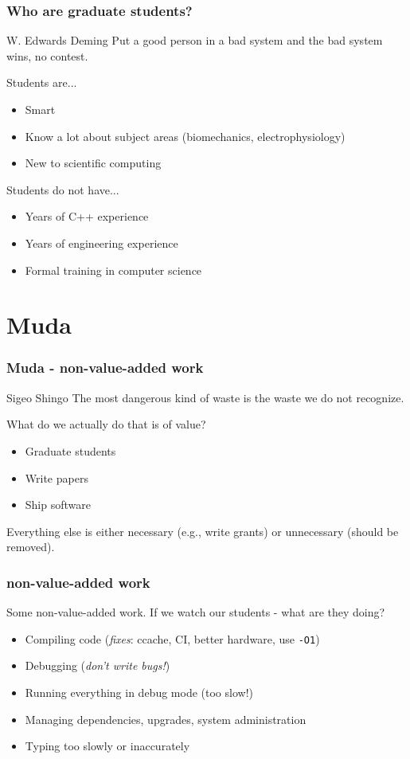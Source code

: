\documentclass[8pt]{beamer}
\begin{document}
\begin{frame}
    \frametitle{Who are graduate students?}
    \begin{aquote}{W. Edwards Deming}
      Put a good person in a bad system and the bad system wins, no contest.
    \end{aquote}

    Students are...
    \begin{itemize}
      \item Smart
      \item Know a lot about subject areas (biomechanics, electrophysiology)
      \item New to scientific computing
    \end{itemize}

    \vfill
    Students do not have...
    \begin{itemize}
      \item Years of C++ experience
      \item Years of engineering experience
      \item Formal training in computer science
    \end{itemize}
\end{frame}

\section{Muda}
\begin{frame}
  \frametitle{Muda - non-value-added work}
  \begin{aquote}{Sigeo Shingo}
    The most dangerous kind of waste is the waste we do not recognize.
  \end{aquote}
  What do we actually do that is of value?

  \pause

  \begin{itemize}
    \item Graduate students
    \item Write papers
    \item Ship software
  \end{itemize}

  Everything else is either necessary (e.g., write grants) or unnecessary
  (should be removed).
\end{frame}

\begin{frame}
  \frametitle{non-value-added work}

  Some non-value-added work. If we watch our students - what are they doing?
  \begin{itemize}
    \item Compiling code (\emph{fixes}: ccache, CI, better hardware, use \texttt{-O1})
    \item Debugging (\emph{don't write bugs!})
    \item Running everything in debug mode (too slow!)
    \item Managing dependencies, upgrades, system administration
    \item Typing too slowly or inaccurately
  \end{itemize}
\end{frame}
\end{document}
